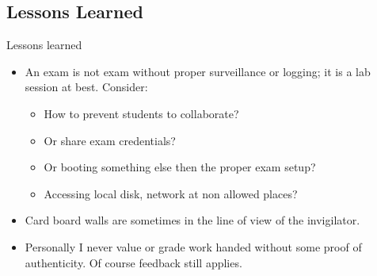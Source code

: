 \subsection[Lessons]{Lessons Learned}
\begin{frame}{Lessons learned}
  \begin{itemize}
  \item An exam is not exam without proper surveillance or logging; it
    is a lab session at best. Consider:
    \begin{itemize}
    \item How to prevent students to collaborate?
    \item Or share exam credentials?
    \item Or booting something else then the proper exam setup?
    \item Accessing local disk, network at non allowed places?
    \end{itemize}
  \item Card board walls are sometimes in the line of view of the invigilator.
  \item Personally I never value or grade work handed without some
    proof of authenticity. Of course feedback still applies.
  \end{itemize}
\end{frame}

